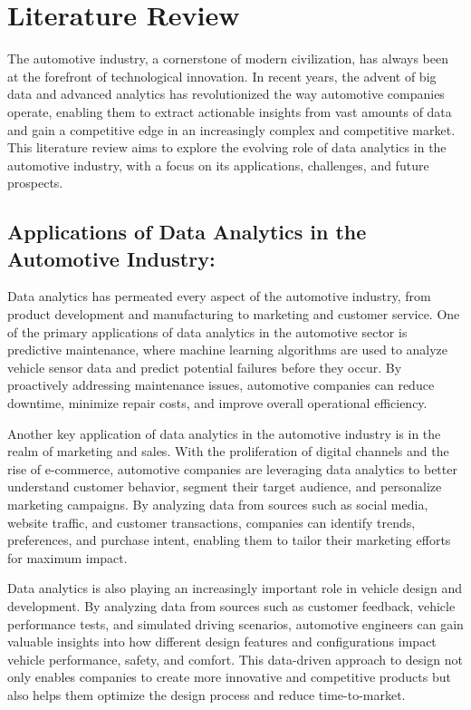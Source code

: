 \documentclass{article}
\begin{document}
\newpage
\section{Literature Review}
\vspace{1cm}
{\fontsize{15}{15}\selectfont


The automotive industry, a cornerstone of modern civilization, has always been at the forefront of technological innovation. In recent years, the advent of big data and advanced analytics has revolutionized the way automotive companies operate, enabling them to extract actionable insights from vast amounts of data and gain a competitive edge in an increasingly complex and competitive market. This literature review aims to explore the evolving role of data analytics in the automotive industry, with a focus on its applications, challenges, and future prospects.

\subsection{Applications of Data Analytics in the Automotive Industry:}

Data analytics has permeated every aspect of the automotive industry, from product development and manufacturing to marketing and customer service. One of the primary applications of data analytics in the automotive sector is predictive maintenance, where machine learning algorithms are used to analyze vehicle sensor data and predict potential failures before they occur. By proactively addressing maintenance issues, automotive companies can reduce downtime, minimize repair costs, and improve overall operational efficiency.

Another key application of data analytics in the automotive industry is in the realm of marketing and sales. With the proliferation of digital channels and the rise of e-commerce, automotive companies are leveraging data analytics to better understand customer behavior, segment their target audience, and personalize marketing campaigns. By analyzing data from sources such as social media, website traffic, and customer transactions, companies can identify trends, preferences, and purchase intent, enabling them to tailor their marketing efforts for maximum impact.

Data analytics is also playing an increasingly important role in vehicle design and development. By analyzing data from sources such as customer feedback, vehicle performance tests, and simulated driving scenarios, automotive engineers can gain valuable insights into how different design features and configurations impact vehicle performance, safety, and comfort. This data-driven approach to design not only enables companies to create more innovative and competitive products but also helps them optimize the design process and reduce time-to-market.

}
\end{document}
